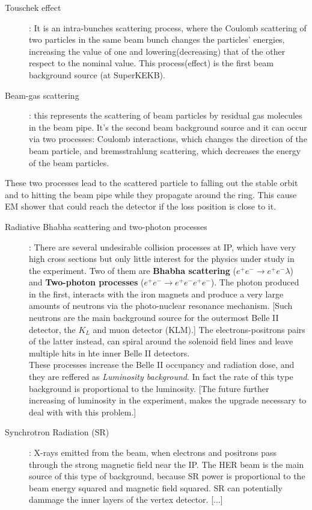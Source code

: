 \begin{description}
\item[Touschek effect]: 
	It is an intra-bunches scattering process, where the Coulomb scattering of two particles in the same beam bunch changes the particles' energies, increasing the value of one and lowering(decreasing) that of the other respect to the nominal value. This process(effect) is the first beam background source (at SuperKEKB).
\item[Beam-gas scattering]: 
	this represents the scattering of beam particles by residual gas molecules in the beam pipe. It's the second beam background source and it can occur via two processes: Coulomb interactions, which changes the direction of the beam particle, and bremsstrahlung scattering, which decreases the energy of the beam particles. 
\end{description}
	
These two processes lead to the scattered particle to falling out the stable orbit and to hitting the beam pipe while they propagate around the ring. This cause EM shower that could reach the detector if the loss position is close to it.

\begin{description}
\item[Radiative Bhabha scattering and two-photon processes]:
	There are several undesirable collision processes at IP, which have very high cross sections but only little interest for the physics under study in the experiment. Two of them are \textbf{Bhabha scattering} ($e^{+}e^{-} \rightarrow e^{+}e^{-} \lambda$) and \textbf{Two-photon processes} ($e^{+}e^{-} \rightarrow e^{+}e^{-}e^{+}e^{-} $). The photon produced in the first, interacts with the iron magnets and produce a very large amounts of neutrons via the photo-nuclear resonance mechanism. [Such neutrons are the main background source for the outermost Belle II detector, the $K_{L}$ and muon detector (KLM).] The electrons-positrons pairs of the latter instead, can spiral around the solenoid field lines and leave multiple hits in hte inner Belle II detectors.\\
	
These processes increase the Belle II occupancy and radiation dose, and they are reffered as \textit{Luminosity background}. In fact the rate of this type background is proportional to the luminosity. [The future further increasing of luminosity in the experiment, makes the upgrade necessary to deal with with this problem.]

\item[Synchrotron Radiation (SR)]:
	X-rays emitted from the beam, when electrons and positrons pass through the strong magnetic field near the IP. The HER beam is the main source of this type of background, because SR power is proportional to the beam energy squared and magnetic field squared.
SR can potentially dammage the inner layers of the vertex detector. [...]
\end{description}

